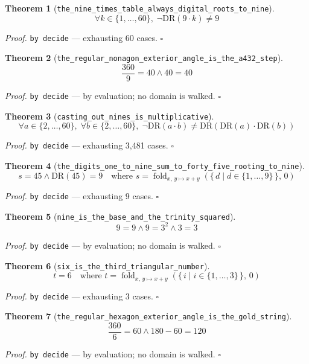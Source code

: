 \documentclass[11pt]{article}
\newtheorem{theorem}{Theorem}[section]
\begin{document}
\begin{theorem}[\texttt{the\_nine\_times\_table\_always\_digital\_roots\_to\_nine}]
\[ \forall k \in \{1,\dots,60\},\; \lnot \mathrm{DR}\mathopen{}\left(9 \cdot k\right) \neq 9 \]
\end{theorem}
\noindent\emph{Proof.} \texttt{by decide} --- exhausting 60 cases. \hfill$\square$

\begin{theorem}[\texttt{the\_regular\_nonagon\_exterior\_angle\_is\_the\_a432\_step}]
\[ \frac{360}{9} = 40 \land 40 = 40 \]
\end{theorem}
\noindent\emph{Proof.} \texttt{by decide} --- by evaluation; no domain is walked. \hfill$\square$

\begin{theorem}[\texttt{casting\_out\_nines\_is\_multiplicative}]
\[ \forall a \in \{2,\dots,60\},\; \forall b \in \{2,\dots,60\},\; \lnot \mathrm{DR}\mathopen{}\left(a \cdot b\right) \neq \mathrm{DR}\mathopen{}\left(\mathrm{DR}\mathopen{}\left(a\right) \cdot \mathrm{DR}\mathopen{}\left(b\right)\right) \]
\end{theorem}
\noindent\emph{Proof.} \texttt{by decide} --- exhausting 3,481 cases. \hfill$\square$

\begin{theorem}[\texttt{the\_digits\_one\_to\_nine\_sum\_to\_forty\_five\_rooting\_to\_nine}]
\[ s = 45 \land \mathrm{DR}\mathopen{}\left(45\right) = 9 \quad \text{where } s = \operatorname{fold}_{x,\,y \mapsto x + y}\left(\{\, d \mid d \in \{1,\dots,9\} \,\},\, 0\right) \]
\end{theorem}
\noindent\emph{Proof.} \texttt{by decide} --- exhausting 9 cases. \hfill$\square$

\begin{theorem}[\texttt{nine\_is\_the\_base\_and\_the\_trinity\_squared}]
\[ 9 = 9 \land 9 = 3^{2} \land 3 = 3 \]
\end{theorem}
\noindent\emph{Proof.} \texttt{by decide} --- by evaluation; no domain is walked. \hfill$\square$

\begin{theorem}[\texttt{six\_is\_the\_third\_triangular\_number}]
\[ t = 6 \quad \text{where } t = \operatorname{fold}_{x,\,y \mapsto x + y}\left(\{\, i \mid i \in \{1,\dots,3\} \,\},\, 0\right) \]
\end{theorem}
\noindent\emph{Proof.} \texttt{by decide} --- exhausting 3 cases. \hfill$\square$

\begin{theorem}[\texttt{the\_regular\_hexagon\_exterior\_angle\_is\_the\_gold\_string}]
\[ \frac{360}{6} = 60 \land 180 - 60 = 120 \]
\end{theorem}
\noindent\emph{Proof.} \texttt{by decide} --- by evaluation; no domain is walked. \hfill$\square$
\end{document}
